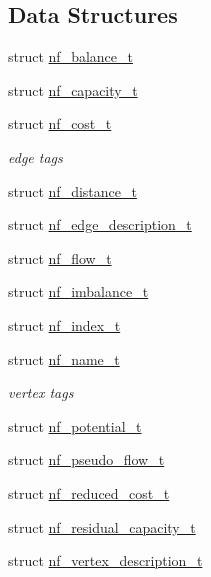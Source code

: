 \subsection*{Data Structures}
\begin{DoxyCompactItemize}
\item 
struct \hyperlink{structnetwork__flow_1_1nf__balance__t}{nf\+\_\+balance\+\_\+t}
\item 
struct \hyperlink{structnetwork__flow_1_1nf__capacity__t}{nf\+\_\+capacity\+\_\+t}
\item 
struct \hyperlink{structnetwork__flow_1_1nf__cost__t}{nf\+\_\+cost\+\_\+t}
\begin{DoxyCompactList}\small\item\em edge tags \end{DoxyCompactList}\item 
struct \hyperlink{structnetwork__flow_1_1nf__distance__t}{nf\+\_\+distance\+\_\+t}
\item 
struct \hyperlink{structnetwork__flow_1_1nf__edge__description__t}{nf\+\_\+edge\+\_\+description\+\_\+t}
\item 
struct \hyperlink{structnetwork__flow_1_1nf__flow__t}{nf\+\_\+flow\+\_\+t}
\item 
struct \hyperlink{structnetwork__flow_1_1nf__imbalance__t}{nf\+\_\+imbalance\+\_\+t}
\item 
struct \hyperlink{structnetwork__flow_1_1nf__index__t}{nf\+\_\+index\+\_\+t}
\item 
struct \hyperlink{structnetwork__flow_1_1nf__name__t}{nf\+\_\+name\+\_\+t}
\begin{DoxyCompactList}\small\item\em vertex tags \end{DoxyCompactList}\item 
struct \hyperlink{structnetwork__flow_1_1nf__potential__t}{nf\+\_\+potential\+\_\+t}
\item 
struct \hyperlink{structnetwork__flow_1_1nf__pseudo__flow__t}{nf\+\_\+pseudo\+\_\+flow\+\_\+t}
\item 
struct \hyperlink{structnetwork__flow_1_1nf__reduced__cost__t}{nf\+\_\+reduced\+\_\+cost\+\_\+t}
\item 
struct \hyperlink{structnetwork__flow_1_1nf__residual__capacity__t}{nf\+\_\+residual\+\_\+capacity\+\_\+t}
\item 
struct \hyperlink{structnetwork__flow_1_1nf__vertex__description__t}{nf\+\_\+vertex\+\_\+description\+\_\+t}
\end{DoxyCompactItemize}
